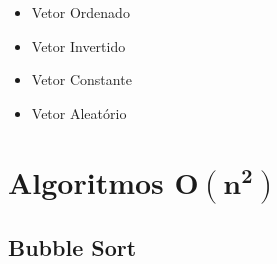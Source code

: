 \documentclass[10pt,a4paper]{report}
\begin{document}
\begin{itemize}
\item Vetor Ordenado
\item Vetor Invertido
\item Vetor Constante
\item Vetor Aleatório
\end{itemize}

\section{Algoritmos $\mathbf{O(n^2)}$}

\subsection{Bubble Sort}

\end{document}
